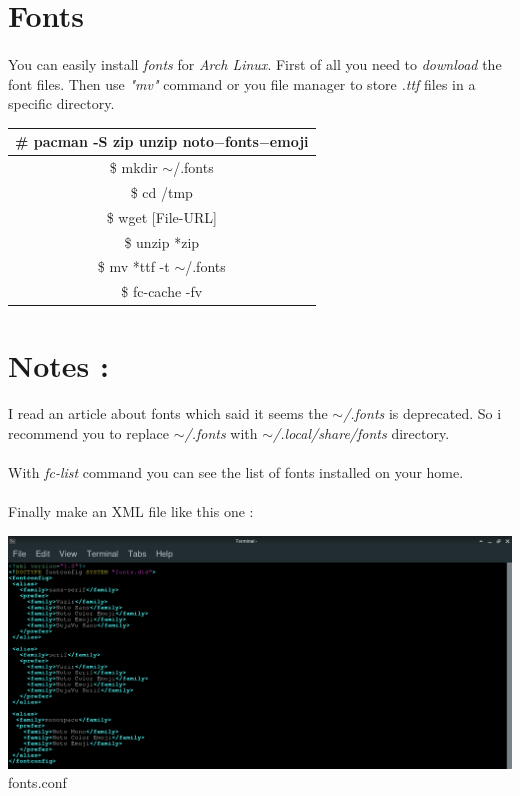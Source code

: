 \documentclass[12pt, a4paper]{article}
\begin{document}
\newpage
\section{Fonts}
\paragraph{}
You can easily install \emph{fonts} for \emph{Arch Linux}. First of all you need to \emph{download} the font files. Then use \emph{"mv"} command or you file manager to store \emph{.ttf} files in a specific directory.\\

\begin{large}
\begin{center}
	\begin{tabular}{|c|} \hline
\# pacman -S zip unzip noto$-$fonts$-$emoji\\ \hline
\$ mkdir $\sim$/.fonts\\ \hline
\$ cd /tmp\\ \hline
\$ wget [File-URL]\\ \hline
\$ unzip *zip\\ \hline
\$ mv *ttf -t $\sim$/.fonts\\ \hline
\$ fc-cache -fv\\ \hline
	\end{tabular}
\end{center}
\end{large}

\section*{Notes :}
\paragraph{}
I read an article about fonts which said it seems the \emph{$\sim$/.fonts} is deprecated. So i recommend you to replace \emph{$\sim$/.fonts} with \emph{$\sim$/.local/share/fonts} directory.

\paragraph{}
With \emph{fc-list} command you can see the list of fonts installed on your home.
\paragraph{}
Finally make an XML file like this one :
\begin{center}
	\includegraphics[scale=0.25]{fontconfig}
	fonts.conf
\end{center}
\end{document}
